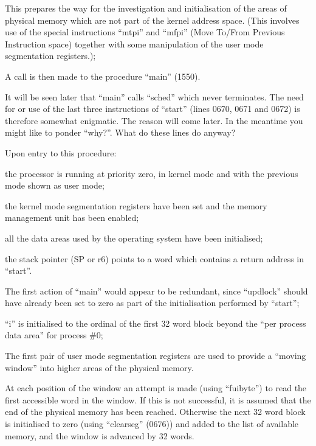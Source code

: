 This prepares the way for the
investigation and initialisation
of the areas of physical memory
which are not part of the kernel
address space. (This involves use
of the special instructions
``mtpi'' and ``mfpi'' (Move To/From
Previous Instruction space)
together with some manipulation
of the user mode segmentation
registers.);

\item[0669:] A call is then made to the procedure ``main'' (1550).
\ed


It will be seen later that ``main'' calls
``sched'' which never terminates. The
need for or use of the last three
instructions of ``start'' (lines 0670,
0671 and 0672) is therefore somewhat
enigmatic. The reason will come later.
In the meantime you might like to
ponder ``why?''. What do these lines do
anyway?



Upon entry to this procedure:

\bd
\item[(a)]  the processor is running at
priority zero, in kernel mode
and with the previous mode shown
as user mode;

\item[(b)] the kernel mode segmentation
registers have been set and the
memory management unit has been
enabled;

\item[(c)] all the data areas used by the
operating system have been initialised;

\item[(d)] the stack pointer (SP or r6)
points to a word which contains
a return address in ``start''.
\ed


\bd
\item[1559:] The first action of ``main'' would
 appear to be redundant, since
 ``updlock'' should have already
 been set to zero as part of the
 initialisation performed by
 ``start'';

\item[1560:] ``i'' is initialised to the ordinal
 of the first 32 word block beyond
 the ``per process data area'' for
 process \#0;

\item[1562:] The first pair of user mode segmentation registers are used to
 provide a ``moving window'' into
 higher areas of the physical
 memory.

At each position of the window an
attempt is made (using ``fuibyte'')
to read the first accessible word
in the window. If this is not
successful, it is assumed that
the end of the physical memory
has been reached.
Otherwise the next 32 word block
is initialised to zero (using
``clearseg'' (0676)) and added to
the list of available memory, and
the window is advanced by 32
words.
\ed

